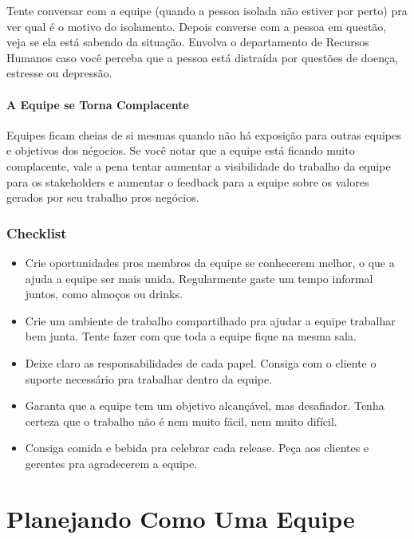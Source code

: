\documentclass[a4paper, 10pt, font=plain]{abnt}
\begin{document}
Tente conversar com a equipe (quando a pessoa isolada não estiver por perto) pra ver qual é o motivo do isolamento. Depois converse com a pessoa em questão, veja se ela está sabendo da situação. Envolva o departamento de Recursos Humanos caso você perceba que a pessoa está distraída por questões de doença, estresse ou depressão.

\subsection{A Equipe se Torna Complacente}
Equipes ficam cheias de si mesmas quando não há exposição para outras equipes e objetivos dos négocios. Se você notar que a equipe está ficando muito complacente, vale a pena tentar aumentar a visibilidade do trabalho da equipe para os stakeholders e aumentar o feedback para a equipe sobre os valores gerados por seu trabalho pros negócios.



\section{Checklist}

\begin{itemize}
\item Crie oportunidades pros membros da equipe se conhecerem melhor, o que a ajuda a equipe ser mais unida. Regularmente gaste um tempo informal juntos, como almoços ou drinks.

\item Crie um ambiente de trabalho compartilhado pra ajudar a equipe trabalhar bem junta. Tente fazer com que toda a equipe fique na mesma sala.

\item Deixe claro as responsabilidades de cada papel. Consiga com o cliente o suporte necessário pra trabalhar dentro da equipe.

\item Garanta que a equipe tem um objetivo alcançável, mas desafiador. Tenha certeza que o trabalho não é nem muito fácil, nem muito difícil.

\item Consiga comida e bebida pra celebrar cada release. Peça aos clientes e gerentes pra agradecerem a equipe.

\end{itemize}



\part{Planejando Como Uma Equipe}
\end{document}
